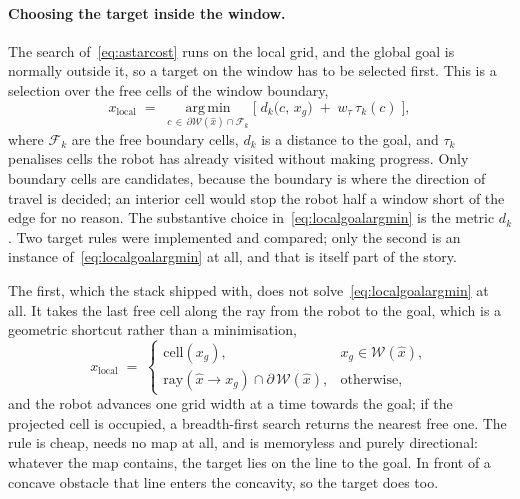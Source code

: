 \documentclass[11pt,a4paper]{article}
\begin{document}
\paragraph{Choosing the target inside the window.} The search of~\eqref{eq:astarcost} runs on the local
grid, and the global goal is normally outside it, so a target on the window has to be selected first. This
is a selection over the free cells of the window boundary,
\begin{equation}
  x_{\mathrm{local}} \;=\;
  \operatorname*{arg\,min}_{c\,\in\,\partial\mathcal{W}(\hat x)\cap\mathcal{F}_k}
  \Big[\; d_k\big(c,\,x_g\big) \;+\; w_\tau\,\tau_k(c) \;\Big],
  \label{eq:localgoalargmin}
\end{equation}
where $\mathcal{F}_k$ are the free boundary cells, $d_k$ is a distance to the goal, and $\tau_k$ penalises
cells the robot has already visited without making progress. Only boundary cells are candidates, because
the boundary is where the direction of travel is decided; an interior cell would stop the robot half a
window short of the edge for no reason. The substantive choice in~\eqref{eq:localgoalargmin} is the metric
$d_k$. Two target rules were implemented and compared; only the second is an instance
of~\eqref{eq:localgoalargmin} at all, and that is itself part of the story.

The first, which the stack shipped with, does not solve~\eqref{eq:localgoalargmin} at all. It takes the
last free cell along the ray from the robot to the goal, which is a geometric shortcut rather than a
minimisation,
\begin{equation}
  x_{\mathrm{local}} \;=\;
  \begin{cases}
    \mathrm{cell}(x_g), & x_g\in\mathcal{W}(\hat x),\\[2pt]
    \mathrm{ray}(\hat x\!\rightarrow\! x_g)\cap\partial\,\mathcal{W}(\hat x), & \text{otherwise},
  \end{cases}
  \label{eq:localgoal}
\end{equation}
and the robot advances one grid width at a time towards the goal; if the projected cell is occupied, a
breadth-first search returns the nearest free one. The rule is cheap, needs no map at all, and is
memoryless and purely directional: whatever the map contains, the target lies on the line to the goal.
In front of a concave obstacle that line enters the concavity, so the target does too.
\end{document}
